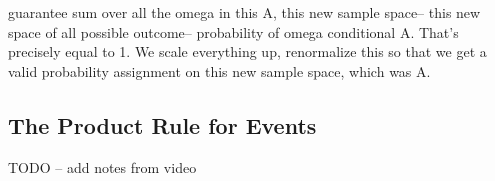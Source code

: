 \documentclass[6008notes.tex]{subfiles}
\begin{document}
guarantee sum over all the omega in this A, this new sample space-- this new space of all possible outcome-- probability of omega conditional A. That's precisely equal to 1. We scale everything up, renormalize this so that we get a valid probability assignment on this new sample space, which was A.

\subsection{The Product Rule for Events}

TODO -- add notes from video

\end{document}
